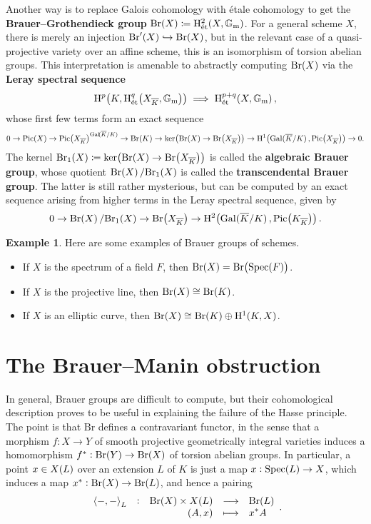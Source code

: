 \documentclass{article}
\theoremstyle{plain}
\theoremstyle{definition}
\newtheorem*{example}{Example}
\newcommand{\Br}{\mathrm{Br}}
\newcommand{\et}{\text{\'et}}
\newcommand{\Gal}{\mathrm{Gal}}
\newcommand{\GG}{\mathbb{G}}
\renewcommand{\H}{\mathrm{H}}
\newcommand{\m}{\mathrm{m}}
\newcommand{\Pic}{\mathrm{Pic}}
\newcommand{\Spec}{\mathrm{Spec}}
\newcommand{\abr}[2][-1]{\ensuremath{\mathinner{\ifthenelse{\equal{#1}{-1}}{\left\langle#2\right\rangle}{}\ifthenelse{\equal{#1}{1}}{\bigl\langle#2\bigr\rangle}{}}}}
\newcommand{\br}{\!\del}
\newcommand{\function}[5]{
  \begin{array}{rcrcl}
    #1 & : & \displaystyle #2 & \longrightarrow & \displaystyle #3 \\
       &   & \displaystyle #4 & \longmapsto     & \displaystyle #5
  \end{array}
}
\begin{document}
Another way is to replace Galois cohomology with \'etale cohomology to get the \textbf{Brauer--Grothendieck group} $ \Br\br{X} \coloneqq \H_\et^2\br{X, \GG_\m} $. For a general scheme $ X $, there is merely an injection $ \Br'\br{X} \hookrightarrow \Br\br{X} $, but in the relevant case of a quasi-projective variety over an affine scheme, this is an isomorphism of torsion abelian groups. This interpretation is amenable to abstractly computing $ \Br\br{X} $ via the \textbf{Leray spectral sequence}
$$ \H^p\br[1]{K, \H_\et^q\br{X_{\overline{K}}, \GG_\m}} \implies \H_\et^{p + q}\br{X, \GG_\m}, $$
whose first few terms form an exact sequence
$$ 0 \to \Pic\br{X} \to \Pic\br{X_{\overline{K}}}^{\Gal\br[0]{\overline{K} / K}} \to \Br\br{K} \to \ker\br[1]{\Br\br{X} \to \Br\br{X_{\overline{K}}}} \to \H^1\br[1]{\Gal\br[0]{\overline{K} / K}, \Pic\br{X_{\overline{K}}}} \to 0. $$
The kernel $ \Br_1\br{X} \coloneqq \ker\br[1]{\Br\br{X} \to \Br\br{X_{\overline{K}}}} $ is called the \textbf{algebraic Brauer group}, whose quotient $ \Br\br{X} / \Br_1\br{X} $ is called the \textbf{transcendental Brauer group}. The latter is still rather mysterious, but can be computed by an exact sequence arising from higher terms in the Leray spectral sequence, given by
$$ 0 \to \Br\br{X} / \Br_1\br{X} \to \Br\br[1]{X_{\overline{K}}} \to \H^2\br[1]{\Gal\br[0]{\overline{K} / K}, \Pic\br{K_{\overline{K}}}}. $$

\begin{example}
Here are some examples of Brauer groups of schemes.
\begin{itemize}
\item If $ X $ is the spectrum of a field $ F $, then $ \Br\br{X} = \Br\br{\Spec\br{F}} $.
\item If $ X $ is the projective line, then $ \Br\br{X} \cong \Br\br{K} $.
\item If $ X $ is an elliptic curve, then $ \Br\br{X} \cong \Br\br{K} \oplus \H^1\br{K, X} $.
\end{itemize}
\end{example}

\section{The Brauer--Manin obstruction}

In general, Brauer groups are difficult to compute, but their cohomological description proves to be useful in explaining the failure of the Hasse principle. The point is that $ \Br $ defines a contravariant functor, in the sense that a morphism $ f : X \to Y $ of smooth projective geometrically integral varieties induces a homomorphism $ f^* : \Br\br{Y} \to \Br\br{X} $ of torsion abelian groups. In particular, a point $ x \in X\br{L} $ over an extension $ L $ of $ K $ is just a map $ x : \Spec\br{L} \to X $, which induces a map $ x^* : \Br\br{X} \to \Br\br{L} $, and hence a pairing
$$ \function{\abr{-, -}_L}{\Br\br{X} \times X\br{L}}{\Br\br{L}}{\br{A, x}}{x^*A}. $$
\end{document}
